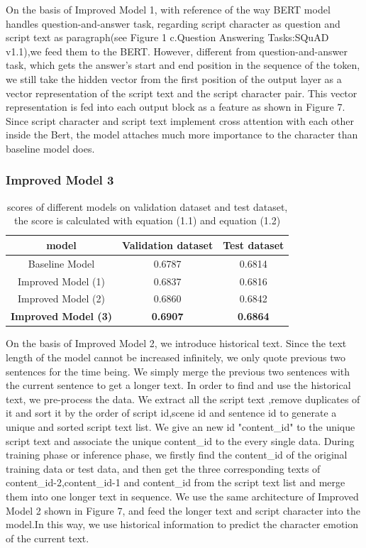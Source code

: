 \documentclass[12pt,twocolumn,letterpaper]{article}
\begin{document}
 On the basis of Improved Model 1, with reference of the way BERT model handles question-and-answer task, regarding script character as question and script text as paragraph(see Figure 1 c.Question Answering Tasks:SQuAD v1.1),we feed them to the BERT. However, different from question-and-answer task, which gets the answer's start and end position in the sequence of the token, we still take the hidden vector from the first position of the output layer as a vector representation of the script text and the script character pair. This vector representation is fed into each output block as a feature as shown in Figure 7. Since script character and script text implement cross attention with each other inside the Bert, the model attaches much more importance to the character than baseline model does.  
\subsubsection{Improved Model 3}

\begin{table}
\begin{center}
\begin{tabular}{|c|c|c|}
\hline
model & Validation dataset  & Test dataset\\
\hline 
\hline
Baseline Model & 0.6787 & 0.6814\\
\hline 
Improved Model (1) & 0.6837 & 0.6816\\
\hline 
Improved Model (2) & 0.6860 & 0.6842\\
\hline 
\bf Improved Model (3) & \bf 0.6907 & \bf 0.6864\\
\hline 
\end{tabular}
\end{center}
\caption{scores of different models on validation dataset and test dataset, the score is calculated with equation (1.1) and equation (1.2)}
\end{table}


On the basis of Improved Model 2, we introduce historical text. Since the text length of the model cannot be increased infinitely, we only quote previous two sentences for the time being. We simply merge the previous two sentences with the current sentence to get a longer text. 
In order to find and use the historical text, we pre-process the data. We extract all the script text ,remove duplicates of it and sort it by the order of script id,scene id and sentence id to generate a unique and sorted script text list. We give an new id "content\_id" to the unique script text and associate the unique content\_id to the every single data. During training phase or inference phase, we firstly find the content\_id of the original training data or test data, and then get the three corresponding texts of content\_id-2,content\_id-1 and content\_id from the script text list and merge them into one longer text in sequence. We use the same architecture of Improved Model 2 shown in Figure 7, and feed the longer text and script character into the model.In this way, we use historical information to predict the character emotion of the current text. 
\end{document}
